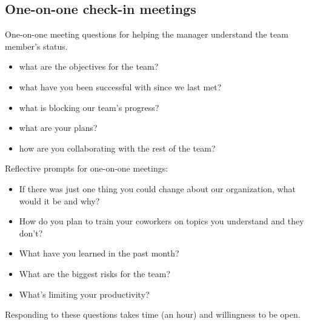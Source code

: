 \subsection{One-on-one check-in meetings}


One-on-one meeting questions for helping the manager understand the team member's status.
\begin{itemize}
    \item what are the objectives for the team?
    \item what have you been successful with since we last met?
    \item what is blocking our team's progress?
    \item what are your plans?
    \item how are you collaborating with the rest of the team?
\end{itemize}

Reflective prompts for one-on-one meetings:
\begin{itemize}
    \item If there was just one thing you could change about our organization, what would it be and why?
    \item How do you plan to train your coworkers on topics you understand and they don't?
    \item What have you learned in the past month?
    \item What are the biggest risks for the team?
    \item What's limiting your productivity?
\end{itemize}
Responding to these questions takes time (an hour) and willingness to be open. 

\ \\


